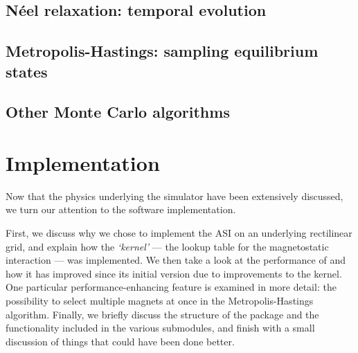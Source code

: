 \subsection{N\'eel relaxation: temporal evolution}
\subsection{Metropolis-Hastings: sampling equilibrium states}
\subsection{Other Monte Carlo algorithms} %

\section{Implementation}\label{sec:2:Implementation}
Now that the physics underlying the simulator have been extensively discussed, we turn our attention to the software implementation. \par
First, we discuss why we chose to implement the ASI on an underlying rectilinear grid, and explain how the \textit{`kernel'} --- the lookup table for the magnetostatic interaction --- was implemented.
We then take a look at the performance of \hotspice and how it has improved since its initial version due to improvements to the kernel.
One particular performance-enhancing feature is examined in more detail: the possibility to select multiple magnets at once in the Metropolis-Hastings algorithm.
Finally, we briefly discuss the structure of the package and the functionality included in the various submodules, and finish with a small discussion of things that could have been done better.

